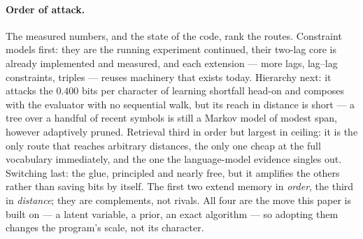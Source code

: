 \documentclass[11pt]{article}
\begin{document}
\paragraph{Order of attack.}  The measured numbers, and the state of
the code, rank the routes.  Constraint models first: they are the
running experiment continued, their two-lag core is already
implemented and measured, and each extension --- more lags, lag--lag
constraints, triples --- reuses machinery that exists today.
Hierarchy next: it attacks the $0.400$ bits per character of learning
shortfall head-on and composes with the evaluator with no sequential
walk, but its reach in distance is short --- a tree over a handful of
recent symbols is still a Markov model of modest span, however
adaptively pruned.  Retrieval third in order but largest in ceiling:
it is the only route that reaches arbitrary distances, the only one
cheap at the full vocabulary immediately, and the one the
language-model evidence singles out.  Switching last: the glue,
principled and nearly free, but it amplifies the others rather than
saving bits by itself.  The first two extend memory in \emph{order},
the third in \emph{distance}; they are complements, not rivals.  All
four are the move this paper is built on --- a latent variable, a
prior, an exact algorithm --- so adopting them changes the program's
scale, not its character.
\end{document}
